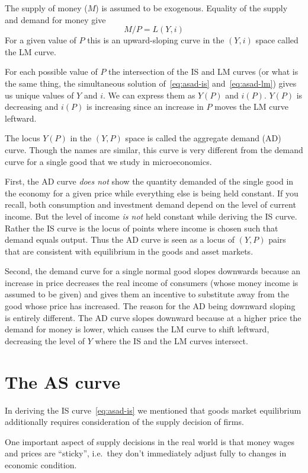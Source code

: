\documentclass[11pt,reqno,openany]{amsbook}
\begin{document}
The supply of money ($M$) is assumed to be exogenous. Equality of
the supply and demand for money give
\begin{equation}
  \label{eq:asad-lm}
  M/P = L(Y,i)
\end{equation}
For a given value of $P$ this is an upward-sloping curve in
the $(Y,i)$ space called the LM curve.

For each possible value of $P$ the intersection of the IS
and LM curves (or what is the same thing, the simultaneous
solution of~\eqref{eq:asad-is} and~\eqref{eq:asad-lm}) gives
us unique values of $Y$ and $i$. We can express them as
$Y(P)$ and $i(P)$. $Y(P)$ is decreasing and $i(P)$ is
increasing since an increase in $P$ moves the LM curve
leftward.

The locus $Y(P)$ in the $(Y,P)$ space is called the
aggregate demand (AD) curve. Though the names are similar,
this curve is very different from the demand curve for a
single good that we study in  microeconomics.

First, the AD curve \emph{does not} show the quantity
demanded of the single good in the economy for a given price
while everything else is being held constant. If you recall,
both consumption and investment demand depend on the level
of current income. But the level of income \emph{is not} held
constant while deriving the IS curve. Rather the IS curve is
the locus of points where income is chosen such that demand
equals output. Thus the AD curve is seen as a locus of
$(Y,P)$ pairs that are consistent with equilibrium in the
goods and asset markets.

Second, the demand curve for a single normal good slopes
downwards because an increase in price decreases the real
income of consumers (whose money income is assumed to be
given) and gives them an incentive to substitute away from
the good whose price has increased. The reason for the AD
being downward sloping is entirely different. The AD curve
slopes downward because at a higher price the demand for
money is lower, which causes the LM curve to shift
leftward, decreasing the level of $Y$ where the IS and the
LM curves intersect.
 
\section{The AS curve}
In deriving the IS curve~\eqref{eq:asad-is} we mentioned
that goods market equilibrium additionally requires
consideration of the supply decision of firms.

One important aspect of supply decisions in the real world
is that money wages and prices are ``sticky'', i.e.\ they
don't immediately adjust fully to changes in economic
condition.
\end{document}
